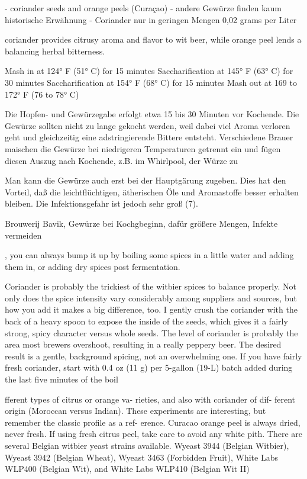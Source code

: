 \documentclass[a4paper,parskip=half]{scrartcl}
\begin{document}
\parencite[40]{Hieronymus2010}
- coriander seeds and orange peels (Curaçao)
- andere Gewürze finden kaum historische Erwähnung
- Coriander nur in geringen Mengen 0,02 grams per Liter

\parencite[73]{Hieronymus2010}
coriander provides citrusy aroma and flavor
to wit beer, while orange peel lends a balancing herbal bitterness.

Mash in at 124° F (51° C) for 15 minutes
Saccharification at 145° F (63° C) for 30 minutes
Saccharification at 154° F (68° C) for 15 minutes
Mash out at 169 to 172° F (76 to 78° C)

\parencite[17]{Strottner1999}
Die Hopfen- und Gewürzegabe erfolgt etwa 15 bis 30 Minuten vor Kochende.
Die Gewürze sollten nicht zu lange gekocht werden, weil dabei viel Aroma verloren
geht und gleichzeitig eine adstringierende Bittere entsteht. Verschiedene Brauer
maischen die Gewürze bei niedrigeren Temperaturen getrennt ein und fügen diesen
Auszug nach Kochende, z.B. im Whirlpool, der Würze zu

\parencite[18]{Strottner1999}
Man kann die Gewürze auch erst bei der Hauptgärung zugeben. Dies hat den Vorteil,
daß die leichtflüchtigen, ätherischen Öle und Aromastoffe besser erhalten bleiben.
Die Infektionsgefahr ist jedoch sehr groß (7).

\parencite[62]{Hieronymus2010}
Brouwerij Bavik, Gewürze bei Kochgbeginn, dafür größere Mengen, Infekte vermeiden

\parencite{Zainasheff2007}
, you can always bump it up by boiling some spices in a little water and adding them in, or adding dry
spices post fermentation.

Coriander is probably the trickiest of the witbier spices to balance properly. Not only does the spice intensity
vary considerably among suppliers and sources, but how you add it makes a big difference, too. I gently crush
the coriander with the back of a heavy spoon to expose the inside of the seeds, which gives it a fairly strong,
spicy character versus whole seeds. The level of coriander is probably the area most brewers overshoot,
resulting in a really peppery beer. The desired result is a gentle, background spicing, not an overwhelming one.
If you have fairly fresh coriander, start with 0.4 oz (11 g) per 5-gallon (19-L) batch added during the last five
minutes of the boil

\parencite[27]{Strong2021}
fferent types of citrus or orange va-
rieties, and also with coriander of dif-
ferent origin (Moroccan versus Indian).
These experiments are interesting, but
remember the classic profile as a ref-
erence. Curacao orange peel is always
dried, never fresh. If using fresh citrus
peel, take care to avoid any white pith.
There are several Belgian witbier
yeast strains available. Wyeast 3944
(Belgian Witbier), Wyeast 3942 (Belgian
Wheat), Wyeast 3463 (Forbidden Fruit),
White Labs WLP400 (Belgian Wit), and
White Labs WLP410 (Belgian Wit II)
\end{document}
